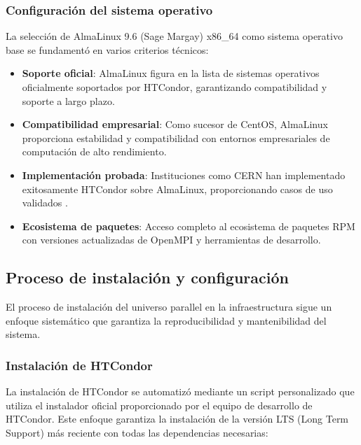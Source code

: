 \subsubsection{Configuración del sistema operativo}
\noindent

La selección de AlmaLinux 9.6 (Sage Margay) x86\_64 como sistema operativo base se fundamentó en varios criterios técnicos:

\begin{itemize}
	\item \textbf{Soporte oficial}: AlmaLinux figura en la lista de sistemas operativos oficialmente soportados por HTCondor, garantizando compatibilidad y soporte a largo plazo.

	\item \textbf{Compatibilidad empresarial}: Como sucesor de CentOS, AlmaLinux proporciona estabilidad y compatibilidad con entornos empresariales de computación de alto rendimiento.

	\item \textbf{Implementación probada}: Instituciones como CERN han implementado exitosamente HTCondor sobre AlmaLinux, proporcionando casos de uso validados \citep{Bunsic2025}.

	\item \textbf{Ecosistema de paquetes}: Acceso completo al ecosistema de paquetes RPM con versiones actualizadas de OpenMPI y herramientas de desarrollo.
\end{itemize}

\subsection{Proceso de instalación y configuración}
\noindent

El proceso de instalación del universo parallel en la infraestructura \GRID sigue un enfoque sistemático que garantiza la reproducibilidad y mantenibilidad del sistema.

\subsubsection{Instalación de HTCondor}
\noindent

La instalación de HTCondor se automatizó mediante un script personalizado que utiliza el instalador oficial proporcionado por el equipo de desarrollo de HTCondor. Este enfoque garantiza la instalación de la versión LTS (Long Term Support) más reciente con todas las dependencias necesarias:


